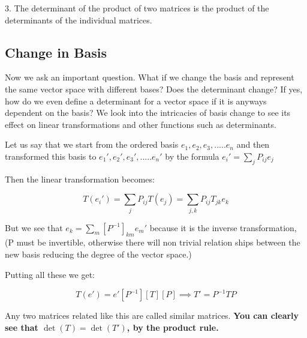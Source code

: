 3. The determinant of the product of two matrices is the product of the determinants of the individual matrices. 


\subsection{Change in Basis}
Now we ask an important question. What if we change the basis and represent the same vector space with different bases? Does the determinant change? If yes, how do we even define a determinant for a vector space if it is anyways dependent on the basis? We look into the intricacies of basis change to see its effect on linear transformations and other functions such as determinants. 


Let us say that we start from the ordered basis $e_1,e_2, e_3, .....e_n$ and then transformed this basis to $e_1', e_2', e_3', ..... e_n'$ by the formula $e_i' = \sum_j P_{ij}e_j$ 


Then the linear transformation becomes: 

$$T(e_i')=\sum_j P_{ij} T(e_j) = \sum_{j,k} P_{ij}T_{jk}e_k$$

But we see that $e_k = \sum_m [P^{-1}]_{km}e_m'$ because it is the inverse transformation, (P must be invertible, otherwise there will non trivial relation ships between the new basis reducing the degree of the vector space.)

Putting all these we get:

$$T(e')=e'[P^{-1}][T][P]  \implies T'=P^{-1}TP$$

Any two matrices related like this are called similar matrices. \textbf{You can clearly see that $\det(T)=\det(T')$, by the product rule.}




